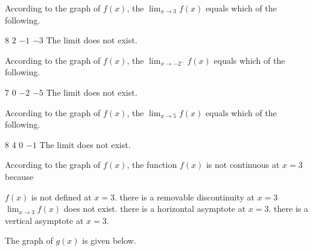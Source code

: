 \documentclass[11pt]{article}
\begin{document}
\begin{questions}
\begin{multiplechoice}{5}

\question According to the graph of $f(x)$, the $\lim_{x\to 3}f(x) $ equals which of the following.
\begin{answers}{3}
\ans $8$
\ans $2$
\ans $-1$
\ans $-3$
\ans The limit does not exist.
\end{answers}



\question According to the graph of $f(x)$, the $\lim_{x\to -2^-}f(x) $ equals which of the following.
\begin{answers}{3}
\ans $7$
\ans $0$
\ans $-2$
\ans $-5$
\ans The limit does not exist.
\end{answers}


\question According to the graph of $f(x)$, the $\lim_{x\to 5}f(x) $ equals which of the following.
\begin{answers}{3}
\ans $8$
\ans $4$
\ans $0$
\ans $-1$
\ans The limit does not exist.
\end{answers}





\question According to the graph of $f(x)$, the function $f(x)$ is not continuous at $x=3$ because
\begin{answers}{3}
\ans $f(x)$ is not defined at $x=3$.
\ans there is a removable discontinuity at $x=3$
\ans $\lim_{x\to 3}f(x)$ does not exist.
\ans there is a horizontal asymptote at $x=3$. 
\ans there is a vertical asymptote at $x=3$.
\end{answers}



\newpage

\question The graph of $g(x)$ is given below.\\


\end{multiplechoice}
\end{questions}
\end{document}
